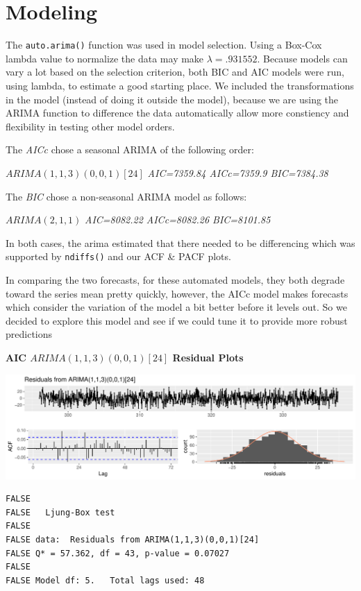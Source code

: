 \documentclass[openany]{book}
\begin{document}
\hypertarget{modeling-2}{%
\section{Modeling}\label{modeling-2}}

The \texttt{auto.arima()} function was used in model selection. Using a
Box-Cox lambda value to normalize the data may make
\(\lambda= .931552\). Because models can vary a lot based on the
selection criterion, both BIC and AIC models were run, using lambda, to
estimate a good starting place. We included the transformations in the
model (instead of doing it outside the model), because we are using the
ARIMA function to difference the data automatically allow more
constiency and flexibility in testing other model orders.

The \emph{AICc} chose a seasonal ARIMA of the following order:

\(ARIMA(1,1,3)(0,0,1)[24]\) \emph{AIC=7359.84 AICc=7359.9 BIC=7384.38}

The \emph{BIC} chose a non-seasonal ARIMA model as follows:

\(ARIMA(2,1,1)\) \emph{AIC=8082.22 AICc=8082.26 BIC=8101.85}

In both cases, the arima estimated that there needed to be differencing
which was supported by \texttt{ndiffs()} and our ACF \& PACF plots.

In comparing the two forecasts, for these automated models, they both
degrade toward the series mean pretty quickly, however, the AICc model
makes forecasts which consider the variation of the model a bit better
before it levels out. So we decided to explore this model and see if we
could tune it to provide more robust predictions

\textbf{AIC \(ARIMA(1,1,3)(0,0,1)[24]\) Residual Plots}

\includegraphics{Group2_Project1_Fall2019_files/figure-latex/unnamed-chunk-22-1.pdf}

\begin{verbatim}
FALSE 
FALSE   Ljung-Box test
FALSE 
FALSE data:  Residuals from ARIMA(1,1,3)(0,0,1)[24]
FALSE Q* = 57.362, df = 43, p-value = 0.07027
FALSE 
FALSE Model df: 5.   Total lags used: 48
\end{verbatim}
\end{document}
